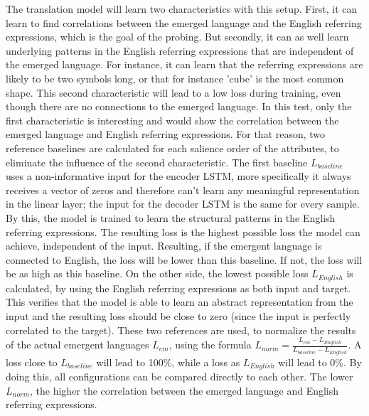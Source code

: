 The translation model will learn two characteristics with this setup.
First, it can learn to find correlations between the emerged language and the English referring expressions, which is the goal of the probing.
But secondly, it can as well learn underlying patterns in the English referring expressions that are independent of the emerged language.
For instance, it can learn that the referring expressions are likely to be two symbols long, or that for instance 'cube' is the most common shape.
This second characteristic will lead to a low loss during training, even though there are no connections to the emerged language.
In this test, only the first characteristic is interesting and would show the correlation between the emerged language and English referring expressions.
For that reason, two reference baselines are calculated for each salience order of the attributes, to eliminate the influence of the second characteristic.
The first baseline $L_{baseline}$ uses a non-informative input for the encoder LSTM, more specifically it always receives a vector of zeros and therefore can't learn any meaningful representation in the linear layer; the input for the decoder LSTM is the same for every sample.
By this, the model is trained to learn the structural patterns in the English referring expressions.
The resulting loss is the highest possible loss the model can achieve, independent of the input.
Resulting, if the emergent language is connected to English, the loss will be lower than this baseline.
If not, the loss will be as high as this baseline.
On the other side, the lowest possible loss $L_{English}$ is calculated, by using the English referring expressions as both input and target.
This verifies that the model is able to learn an abstract representation from the input and the resulting loss should be close to zero (since the input is perfectly correlated to the target).
These two references are used, to normalize the results of the actual emergent languages $L_{em}$, using the formula $L_{norm} = \frac{L_{em}-L_{English}}{L_{baseline} - L_{English}}$.
A loss close to $L_{baseline}$ will lead to 100\%, while a loss as $L_{English}$ will lead to 0\%.
By doing this, all configurations can be compared directly to each other.
The lower $L_{norm}$, the higher the correlation between the emerged language and English referring expressions.

